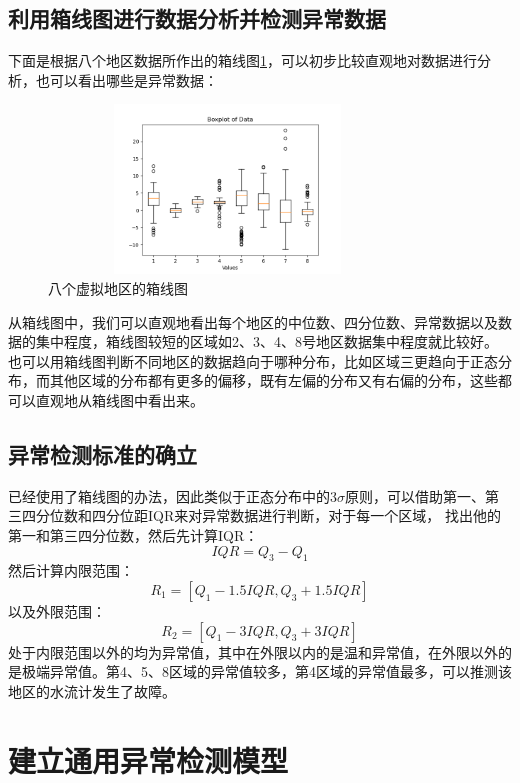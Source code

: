 \documentclass[UTF8]{article}
\begin{document}
			\subsection{利用箱线图进行数据分析并检测异常数据}
			下面是根据八个地区数据所作出的箱线图\ref{Box}，可以初步比较直观地对数据进行分析，也可以看出哪些是异常数据：
			\begin{figure}[!ht]
				\centering %
				\includegraphics[height=4.5cm,width=9.5cm]{pictures/BoxPlot.png}
				\caption{八个虚拟地区的箱线图}
				\label{Box}
			\end{figure}
			\par 从箱线图中，我们可以直观地看出每个地区的中位数、四分位数、异常数据以及数据的集中程度，箱线图较短的区域如2、3、4、8号地区数据集中程度就比较好。
			也可以用箱线图判断不同地区的数据趋向于哪种分布，比如区域三更趋向于正态分布，而其他区域的分布都有更多的偏移，既有左偏的分布又有右偏的分布，这些都可以直观地从箱线图中看出来。
		\subsection{异常检测标准的确立}
			已经使用了箱线图的办法，因此类似于正态分布中的3$\sigma$原则，可以借助第一、第三四分位数和四分位距IQR来对异常数据进行判断，对于每一个区域，
			找出他的第一和第三四分位数，然后先计算IQR：
			$$
			IQR=Q_3-Q_1
			$$
			然后计算内限范围：
			$$
			R_1=\left[ Q_1-1.5IQR,Q_3+1.5IQR \right] 
			$$
			以及外限范围：
			$$
			R_2=\left[ Q_1-3IQR,Q_3+3IQR \right] 
			$$
			处于内限范围以外的均为异常值，其中在外限以内的是温和异常值，在外限以外的是极端异常值。第4、5、8区域的异常值较多，第4区域的异常值最多，可以推测该地区的水流计发生了故障。
	\section{建立通用异常检测模型}
\end{document}
